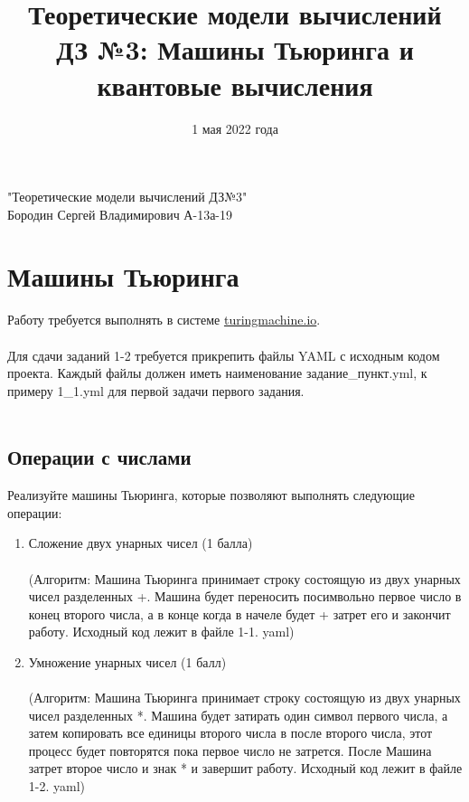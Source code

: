 \documentclass{article}
\title{Теоретические модели вычислений \\
ДЗ №3: Машины Тьюринга и квантовые вычисления}
\date{1 мая 2022 года}
\begin{document}
\begin{center}
"Теоретические модели вычислений ДЗ№3" \\
Бородин Сергей Владимирович А-13а-19
\end{center}
\vspace{6em}




\newpage

\maketitle

\section{Машины Тьюринга}

Работу требуется выполнять в системе \url{turingmachine.io}. \\\\
Для сдачи заданий 1-2 требуется прикрепить файлы YAML с исходным кодом проекта. Каждый файлы должен иметь наименование задание\_пункт.yml, к примеру 1\_1.yml для первой задачи первого задания. \\\\

\subsection{Операции с числами}

Реализуйте машины Тьюринга, которые позволяют выполнять следующие операции:
\begin{enumerate}
    \item Сложение двух унарных чисел (1 балла)\\\\
    \text(Алгоритм: Машина Тьюринга принимает строку состоящую из двух унарных чисел разделенных +. Машина будет 
    переносить посимвольно первое число в конец второго числа, а в конце когда в начеле будет + затрет его и закончит работу. Исходный код лежит в файле 1-1. yaml) 
    \item Умножение унарных чисел (1 балл)\\\\
    \text(Алгоритм: Машина Тьюринга принимает строку состоящую из двух унарных чисел разделенных *. Машина будет затирать один символ первого числа, а затем копировать все единицы второго числа в после второго числа, этот процесс будет повторятся пока первое число не затрется. После Машина затрет второе число и знак * и завершит работу. Исходный код лежит в файле 1-2. yaml)
\end{enumerate}
\end{document}
